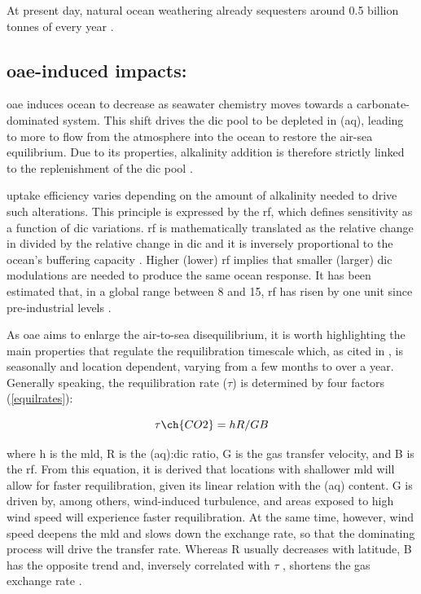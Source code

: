 At present day, natural ocean weathering already sequesters around 0.5 billion tonnes of  every year \citep{NAP26278}.

\subsection[\texorpdfstring{OAE}{OAE}-induced impacts:]{\ac{oae}-induced impacts:}

\ac{oae} induces ocean  to decrease as seawater chemistry moves towards a carbonate-dominated system. This shift drives the \ac{dic} pool to be depleted in (aq), leading to more  to flow from the atmosphere into the ocean to restore the air-sea equilibrium. Due to its properties, alkalinity addition is therefore strictly linked to the replenishment of the \ac{dic} pool \citep{he2022limits}.

 uptake efficiency varies depending on the amount of alkalinity needed to drive such alterations. This principle is expressed by the \ac{rf}, which defines  sensitivity as a function of \ac{dic} variations. \ac{rf} is mathematically translated as the relative change in  divided by the relative change in \ac{dic} \citep{devries2022ocean} and it is inversely proportional to the ocean's buffering capacity \citep{renforth2017assessing}. Higher (lower) \ac{rf} implies that smaller (larger) \ac{dic} modulations are needed to produce the same ocean  response. It has been estimated that, in a global range between 8 and 15, \ac{rf} has risen by one unit since pre-industrial levels \citep{mcneil2019changing, egleston2010revelle}.

As \ac{oae} aims to enlarge the air-to-sea  disequilibrium, it is worth highlighting the main properties that regulate the requilibration timescale which, as cited in \cite{jones2014spatial}, is seasonally and location dependent, varying from a few months to over a year. Generally speaking, the  requilibration rate ($\tau$) is determined by four factors (\ref{equilrates}): 

\begin{center}

\begin{equation} 
\label{equilrates}
\tau \ch{CO2} = hR/GB
\end{equation}

\end{center}

where h is the \ac{mld}, R is the (aq):\ac{dic} ratio, G is the gas transfer velocity, and B is the \acl{rf}. From this equation, it is derived that locations with shallower \ac{mld} will allow for faster requilibration, given its linear relation with the (aq) content. G is driven by, among others, wind-induced turbulence, and areas exposed to high wind speed will experience faster requilibration. At the same time, however, wind speed deepens the \ac{mld} and slows down the exchange rate, so that the dominating process will drive the transfer rate. Whereas R usually decreases with latitude, B has the opposite trend and, inversely correlated with $\tau$ , shortens the gas exchange rate \citep{jones2014spatial}. 

